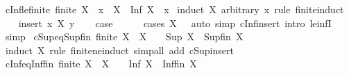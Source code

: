 \begin{isabellebody}
\isanewline
{}\isamarkupfalse%
\ cInf{\isacharunderscore}{\kern0pt}le{\isacharunderscore}{\kern0pt}finite{\isacharcolon}{\kern0pt}\ {\isachardoublequoteopen}finite\ X\ {\isasymLongrightarrow}\ x\ {\isasymin}\ X\ {\isasymLongrightarrow}\ Inf\ X\ {\isasymle}\ x{\isachardoublequoteclose}\isanewline
%
\isadelimproof
%
\endisadelimproof
%
\isatagproof
{}\isamarkupfalse%
\ {\isacharparenleft}{\kern0pt}induct\ X\ arbitrary{\isacharcolon}{\kern0pt}\ x\ rule{\isacharcolon}{\kern0pt}\ finite{\isacharunderscore}{\kern0pt}induct{\isacharparenright}{\kern0pt}\isanewline
\ \ \isamarkupfalse%
\ {\isacharparenleft}{\kern0pt}insert\ x\ X\ y{\isacharparenright}{\kern0pt}\ \isamarkupfalse%
\ \isamarkupfalse%
\ {\isacharquery}{\kern0pt}case\isanewline
\ \ \ \ \isamarkupfalse%
\ {\isacharparenleft}{\kern0pt}cases\ {\isachardoublequoteopen}X\ {\isacharequal}{\kern0pt}\ {\isacharbraceleft}{\kern0pt}{\isacharbraceright}{\kern0pt}{\isachardoublequoteclose}{\isacharparenright}{\kern0pt}\ {\isacharparenleft}{\kern0pt}auto\ simp{\isacharcolon}{\kern0pt}\ cInf{\isacharunderscore}{\kern0pt}insert\ intro{\isacharcolon}{\kern0pt}\ le{\isacharunderscore}{\kern0pt}infI{}{\isacharparenright}{\kern0pt}\isanewline
{}\isamarkupfalse%
\ simp%
\endisatagproof
{\isafoldproof}%
%
\isadelimproof
\isanewline
%
\endisadelimproof
\isanewline
{}\isamarkupfalse%
\ cSup{\isacharunderscore}{\kern0pt}eq{\isacharunderscore}{\kern0pt}Sup{\isacharunderscore}{\kern0pt}fin{\isacharcolon}{\kern0pt}\ {\isachardoublequoteopen}finite\ X\ {\isasymLongrightarrow}\ X\ {\isasymnoteq}\ {\isacharbraceleft}{\kern0pt}{\isacharbraceright}{\kern0pt}\ {\isasymLongrightarrow}\ Sup\ X\ {\isacharequal}{\kern0pt}\ Sup{\isacharunderscore}{\kern0pt}fin\ X{\isachardoublequoteclose}\isanewline
%
\isadelimproof
\ \ %
\endisadelimproof
%
\isatagproof
{}\isamarkupfalse%
\ {\isacharparenleft}{\kern0pt}induct\ X\ rule{\isacharcolon}{\kern0pt}\ finite{\isacharunderscore}{\kern0pt}ne{\isacharunderscore}{\kern0pt}induct{\isacharparenright}{\kern0pt}\ {\isacharparenleft}{\kern0pt}simp{\isacharunderscore}{\kern0pt}all\ add{\isacharcolon}{\kern0pt}\ cSup{\isacharunderscore}{\kern0pt}insert{\isacharparenright}{\kern0pt}%
\endisatagproof
{\isafoldproof}%
%
\isadelimproof
\isanewline
%
\endisadelimproof
\isanewline
{}\isamarkupfalse%
\ cInf{\isacharunderscore}{\kern0pt}eq{\isacharunderscore}{\kern0pt}Inf{\isacharunderscore}{\kern0pt}fin{\isacharcolon}{\kern0pt}\ {\isachardoublequoteopen}finite\ X\ {\isasymLongrightarrow}\ X\ {\isasymnoteq}\ {\isacharbraceleft}{\kern0pt}{\isacharbraceright}{\kern0pt}\ {\isasymLongrightarrow}\ Inf\ X\ {\isacharequal}{\kern0pt}\ Inf{\isacharunderscore}{\kern0pt}fin\ X{\isachardoublequoteclose}\isanewline

\end{isabellebody}
